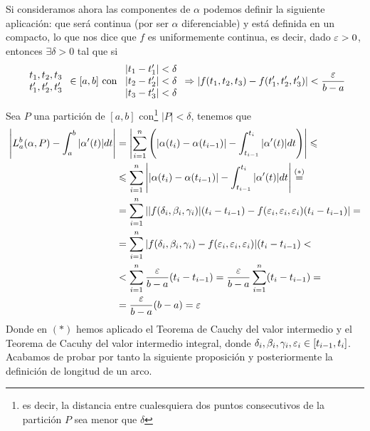 \begin{observacion}
    Si consideramos ahora las componentes de $\alpha$ podemos definir la siguiente aplicación:
    que será continua (por ser $\alpha$ diferenciable) y está definida en un compacto, lo que nos dice que $f$ es uniformemente continua, es decir, dado $\varepsilon>0$, entonces $\exists \delta > 0$ tal que si
    \begin{gather*}
        \begin{array}{c}
            t_1,t_2,t_3\\
            t_1',t_2',t_3'
        \end{array} \in [a,b] \text{ con }
        \begin{array}{c}
            |t_1-t_1'| < \delta \\
            |t_2-t_2'| < \delta \\
            |t_3-t_3'| < \delta 
        \end{array} \Rightarrow |f(t_1,t_2,t_3) - f(t_1', t_2', t_3')| < \frac{\varepsilon}{b-a}
    \end{gather*}
    Sea $P$ una partición de $[a,b]$ con\footnote{es decir, la distancia entre cualesquiera dos puntos consecutivos de la partición $P$ sea menor que $\delta$} $|P| < \delta$, tenemos que
    \begin{align*}
        \left| L_a^b(\alpha, P) - \int_{a}^{b} |\alpha'(t)| dt\right| &=
        \left|\sum_{i=1}^{n}\left( |\alpha(t_i) - \alpha(t_{i-1})| - \int_{t_{i-1}}^{t_i} |\alpha'(t)| dt \right)\right| \leqslant\\
        &\leqslant \sum_{i=1}^{n}\left| |\alpha(t_i) - \alpha(t_{i-1})| - \int_{t_{i-1}}^{t_i} |\alpha'(t)| dt \right| \overset{(\ast)}{=} \\
        &= \sum_{i=1}^{n}\left| |f(\delta_i, \beta_i, \gamma_i)|(t_i-t_{i-1}) - f(\varepsilon_i, \varepsilon_i, \varepsilon_i)(t_i-t_{i-1}) \right| =\\
        &= \sum_{i=1}^{n} |f(\delta_i, \beta_i, \gamma_i) - f(\varepsilon_i, \varepsilon_i, \varepsilon_i)|(t_i-t_{i-1}) <\\
        &< \sum_{i=1}^{n} \frac{\varepsilon}{b-a} (t_i-t_{i-1})
        = \frac{\varepsilon}{b-a} \sum_{i=1}^{n} (t_i-t_{i-1}) =\\
        &= \frac{\varepsilon}{b-a} (b-a) = \varepsilon
    \end{align*}
    Donde en $(\ast)$ hemos aplicado el Teorema de Cauchy del valor intermedio y el Teorema de Cacuhy del valor intermedio integral, donde $\delta_i, \beta_i, \gamma_i, \varepsilon_i \in [t_{i-1}, t_i]$. Acabamos de probar por tanto la siguiente proposición y posteriormente la definición de longitud de un arco.
\end{observacion}

